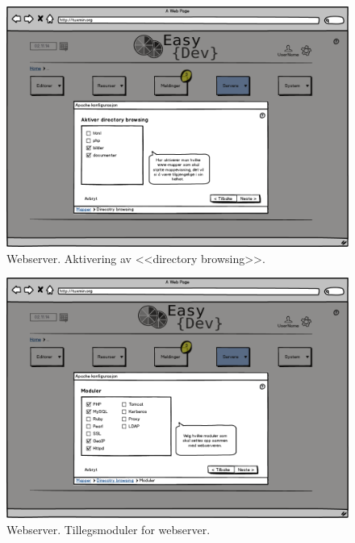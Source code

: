 \begin{figure}[ht]
\centering
\includegraphics[width=\lowB\textwidth,height=\textheight,keepaspectratio]{./img/prosessdokumentasjon/lowfi/apache3.png}
\caption[Low-fi Webserver 3]{Webserver. Aktivering av <<directory browsing>>.}
\label{fig:apachelow3}
\end{figure}

\begin{figure}[ht]
\centering
\includegraphics[width=\lowB\textwidth,height=\textheight,keepaspectratio]{./img/prosessdokumentasjon/lowfi/apache4.png}
\caption[Low-fi Webserver 4]{Webserver. Tillegsmoduler for webserver.}
\label{fig:apachelow4}
\end{figure}

